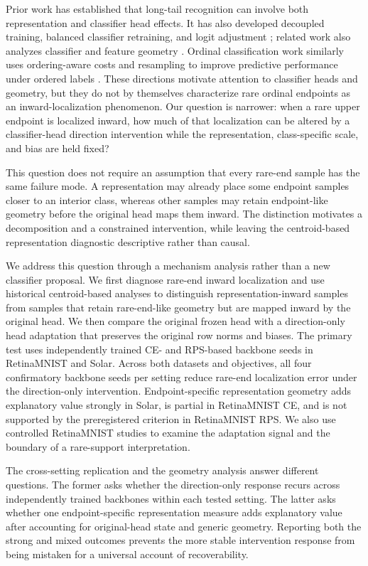 Prior work has established that long-tail recognition can involve both
representation and classifier head effects. It has also developed decoupled
training, balanced classifier retraining, and logit adjustment
\cite{kang2020decoupling,alshammari2022weight,menon2021logit}; related work
also analyzes classifier and feature geometry
\cite{c2am2022angular,zhu2022balanced,yi2025geometry,wang2026alignment}.
Ordinal classification work similarly uses ordering-aware costs and
resampling to improve predictive performance under ordered labels
\cite{zhu2019smor,lazaro2023bayesian}. These directions
motivate attention to classifier heads and geometry, but they do not by
themselves characterize rare ordinal endpoints as an inward-localization
phenomenon. Our question is narrower: when a rare upper endpoint is localized
inward, how much of that localization can be altered by a classifier-head
direction intervention while the representation, class-specific scale, and bias
are held fixed?

This question does not require an assumption that every rare-end sample has the
same failure mode. A representation may already place some endpoint samples
closer to an interior class, whereas other samples may retain endpoint-like
geometry before the original head maps them inward. The distinction motivates a
decomposition and a constrained intervention, while leaving the centroid-based
representation diagnostic descriptive rather than causal.

We address this question through a mechanism analysis rather than a new
classifier proposal. We first diagnose rare-end inward localization and use
historical centroid-based analyses to distinguish representation-inward samples
from samples that retain rare-end-like geometry but are mapped inward by the
original head. We then compare the original frozen head with a direction-only
head adaptation that preserves the original row norms and biases. The primary
test uses independently trained CE- and RPS-based backbone seeds in
RetinaMNIST and Solar. Across both datasets and objectives, all four
confirmatory backbone seeds per setting reduce rare-end localization error under
the direction-only intervention. Endpoint-specific representation geometry adds
explanatory value strongly in Solar, is partial in RetinaMNIST CE, and is not
supported by the preregistered criterion in RetinaMNIST RPS. We also use
controlled RetinaMNIST studies to examine the adaptation signal and the
boundary of a rare-support interpretation.

The cross-setting replication and the geometry analysis answer different
questions. The former asks whether the direction-only response recurs across
independently trained backbones within each tested setting. The latter asks
whether one endpoint-specific representation measure adds explanatory value
after accounting for original-head state and generic geometry. Reporting both
the strong and mixed outcomes prevents the more stable intervention response
from being mistaken for a universal account of recoverability.

